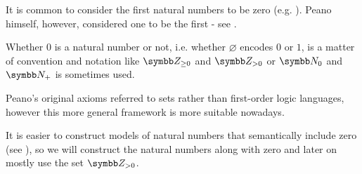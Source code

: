 \begin{remark}\label{remark:peano_arithmetic_zero}
  It is common to consider the first natural numbers to be zero (e.g. \cite[67]{Enderton1977}). Peano himself, however, considered one to be the first - see \cite[1]{Peano1889}.

  Whether \( 0 \) is a natural number or not, i.e. whether \( \varnothing \) encodes \( 0 \) or \( 1 \), is a matter of convention and notation like \( \BZ_{\geq 0} \) and \( \BZ_{>0} \) or \( \BN_0 \) and \( \BN_+ \) is sometimes used.

  Peano's original axioms referred to sets rather than first-order logic languages, however this more general framework is more suitable nowadays.

  It is easier to construct models of natural numbers that semantically include zero (see ), so we will construct the natural numbers along with zero and later on mostly use the set \( \BZ_{>0} \).
\end{remark}

